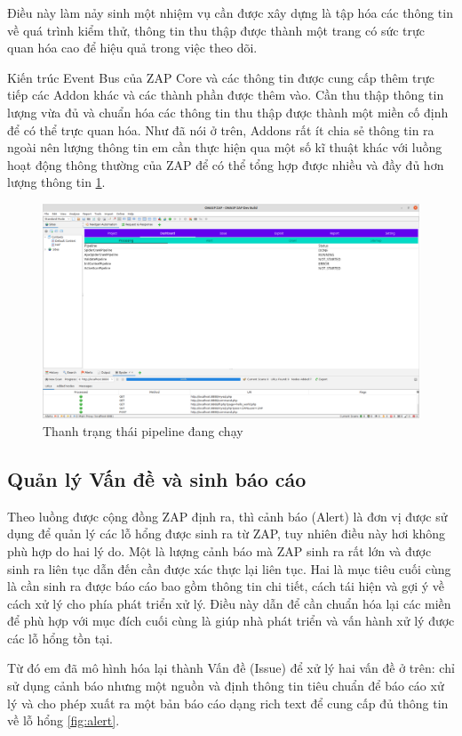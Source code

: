 \documentclass[./../main.tex]{subfiles}
\begin{document}
Điều này làm nảy sinh một nhiệm vụ cần được xây dựng là tập hóa các thông
tin về quá trình kiểm thử, thông tin thu thập được thành một trang có sức
trực quan hóa cao để hiệu quả trong việc theo dõi.

Kiến trúc Event Bus của ZAP Core và các thông tin được cung cấp thêm trực
tiếp các Addon khác và các thành phần được thêm vào. Cần thu thập thông
tin lượng vừa đủ và chuẩn hóa các thông tin thu thập được thành một miền
cố định để có thể trực quan hóa. Như đã nói ở trên, Addons rất ít chia sẻ
thông tin ra ngoài nên lượng thông tin em cần thực hiện qua một số kĩ
thuật khác với luồng hoạt động thông thường của ZAP để có thể tổng hợp
được nhiều và đầy đủ hơn lượng thông tin \ref{fig:state}.

\begin{figure}[h!]
	\includegraphics[width=\linewidth]{./images/state.png}
	\caption{Thanh trạng thái pipeline đang chạy}
	\label{fig:state}
\end{figure}

\subsection{Quản lý Vấn đề và sinh báo cáo}
Theo luồng được cộng đồng ZAP định ra, thì cảnh báo (Alert) là đơn
vị được sử dụng để quản lý các lỗ hổng được sinh ra từ ZAP, tuy nhiên
điều này hơi không phù hợp do hai lý do. Một là lượng cảnh báo mà ZAP
sinh ra rất lớn và được sinh ra liên tục dẫn đến cần được xác thực lại
liên tục. Hai là mục tiêu cuối cùng là cần sinh ra được báo cáo bao gồm
thông tin chi tiết, cách tái hiện và gợi ý về cách xử lý cho phía
phát triển xử lý. Điều này dẫn để cần chuẩn hóa lại các miền để
phù hợp với mục đích cuối cùng là giúp nhà phát triển và vấn hành
xử lý được các lỗ hổng tồn tại.

Từ đó em đã mô hình hóa lại thành Vấn đề (Issue) để xử lý hai vấn đề ở trên:
chỉ sử dụng cảnh báo nhưng một nguồn và định thông tin tiêu chuẩn để
báo cáo xử lý và cho phép xuất ra một bản báo cáo dạng rich text để cung
cấp đủ thông tin về lỗ hổng \ref{fig:alert}.
\end{document}
